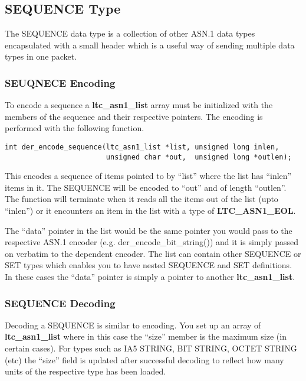 \documentclass[a4paper]{book}
\begin{document}
\subsection{SEQUENCE Type}
The SEQUENCE data type is a collection of other ASN.1 data types encapsulated with a small header which is a useful way of sending multiple data types in one packet.

\subsubsection{SEUQNECE Encoding}
To encode a sequence a \textbf{ltc\_asn1\_list} array must be initialized with the members of the sequence and their respective pointers.  The encoding is performed
with the following function.

\begin{verbatim}
int der_encode_sequence(ltc_asn1_list *list, unsigned long inlen,
                        unsigned char *out,  unsigned long *outlen);
\end{verbatim}
This encodes a sequence of items pointed to by ``list'' where the list has ``inlen'' items in it.  The SEQUENCE will be encoded to ``out'' and of length ``outlen''.  The
function will terminate when it reads all the items out of the list (upto ``inlen'') or it encounters an item in the list with a type of \textbf{LTC\_ASN1\_EOL}.

The ``data'' pointer in the list would be the same pointer you would pass to the respective ASN.1 encoder (e.g. der\_encode\_bit\_string()) and it is simply passed on
verbatim to the dependent encoder.  The list can contain other SEQUENCE or SET types which enables you to have nested SEQUENCE and SET definitions.  In these cases
the ``data'' pointer is simply a pointer to another \textbf{ltc\_asn1\_list}.

\subsubsection{SEQUENCE Decoding}


Decoding a SEQUENCE is similar to encoding.  You set up an array of \textbf{ltc\_asn1\_list} where in this case the ``size'' member is the maximum size 
(in certain cases).  For types such as IA5 STRING, BIT STRING, OCTET STRING (etc) the ``size'' field is updated after successful decoding to reflect how many
units of the respective type has been loaded.  
\end{document}
